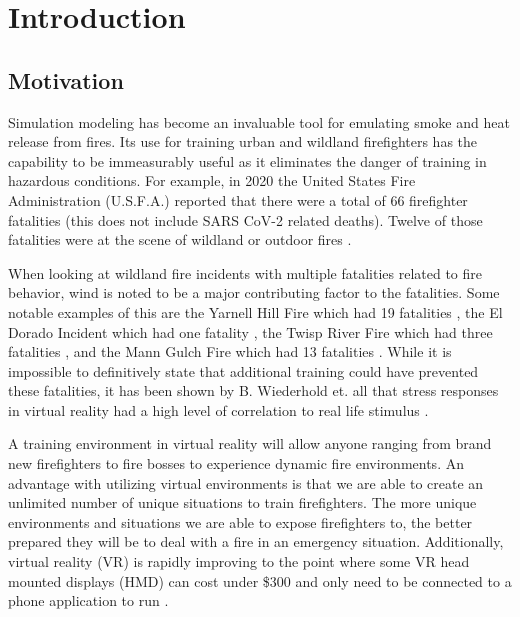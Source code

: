 
\chapter{Introduction} %

\label{ChapterX} %


\section{Motivation}

Simulation modeling has become an invaluable tool for emulating smoke and heat release from fires. Its use for training urban and wildland firefighters has the capability to be immeasurably useful as it eliminates the danger of training in hazardous conditions. For example, in 2020 the United States Fire Administration (U.S.F.A.) reported that there were a total of 66 firefighter fatalities (this does not include SARS CoV-2 related deaths). Twelve of those fatalities were at the scene of wildland or outdoor fires \cite{FireFatalities}.

When looking at wildland fire incidents with multiple fatalities related to fire behavior, wind is noted to be a major contributing factor to the fatalities. Some notable examples of this are the Yarnell Hill Fire which had 19 fatalities \cite{yarnellhillfire_2013}, the El Dorado Incident which had one fatality \cite{ElDorado}, the Twisp River Fire which had three fatalities \cite{Twisp}, and the Mann Gulch Fire which had 13 fatalities \cite{mannGulch}. While it is impossible to definitively state that additional training could have prevented these fatalities, it has been shown by B. Wiederhold et. all that stress responses in virtual reality had a high level of correlation to real life stimulus  \cite{Wiederhold200310AI}.

\par
A training environment in virtual reality will allow anyone ranging from brand new  firefighters to fire bosses to experience dynamic fire environments. An advantage with utilizing virtual environments is that we are able to create an unlimited number of unique situations to train firefighters. The more unique environments and situations we are able to expose firefighters to, the better prepared they will be to deal with a fire in an emergency situation. Additionally, virtual reality (VR) is rapidly improving to the point where some VR head mounted displays (HMD) can cost under \$300 and only need to be connected to a phone application to run \cite{Quest}.   \par

